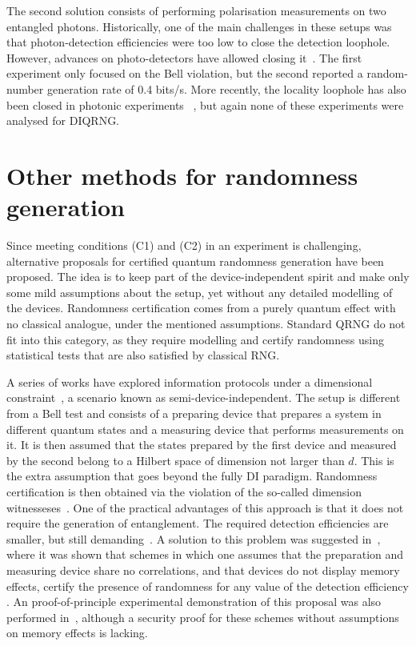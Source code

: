 \documentclass[11pt,a4paper]{article}
\begin{document}
The second solution consists of performing polarisation measurements on two entangled photons. Historically, one of the main challenges in these setups was that photon-detection efficiencies were too low to close the detection loophole. However, advances on photo-detectors have allowed closing it~\cite{zeilinger,kwiat}. The first experiment only focused on the Bell violation, but the second reported a random-number generation rate of 0.4 bits/s. More recently, the locality loophole has also been closed in photonic experiments~\cite{giustina,nistexp}%
, but again none of these experiments were analysed for DIQRNG.

\section{Other methods for randomness generation}
\label{semidiqrng}

Since meeting conditions (C1) and (C2) in an experiment is challenging, alternative proposals for certified quantum randomness generation have been proposed. The idea is to keep part of the device-independent spirit and make only some mild assumptions about the setup, yet without any detailed modelling of the devices. Randomness certification comes from a purely quantum effect with no classical analogue, under the mentioned assumptions. Standard QRNG do not fit into this category, as they require modelling and certify randomness using statistical tests that are also satisfied by classical RNG.

A series of works have explored information protocols under a dimensional constraint~\cite{PB, Pawlowski}, a scenario known as semi-device-independent. The setup is different from a Bell test and consists of a preparing device that prepares a system in different quantum states and a measuring device that performs measurements on it. It is then assumed that the states prepared by the first device and measured by the second belong to a Hilbert space of dimension not larger than $d$. This is the extra assumption that goes beyond the fully DI paradigm. Randomness certification is then obtained via the violation of the so-called dimension witnesseses~\cite{rodrigo2}. One of the practical advantages of this approach is that it %
does not require the generation of entanglement. The required detection efficiencies are smaller, but still demanding~\cite{passaro}. A solution to this problem was suggested in~\cite{bowles}, where it was shown that schemes in which one assumes that the preparation and measuring device share no correlations, and that devices do not display memory effects, certify the presence of randomness for any value of the detection efficiency . An proof-of-principle experimental demonstration of this proposal was also performed in~\cite{zbinden}, although a security proof for these schemes without assumptions on memory effects is lacking.
\end{document}

